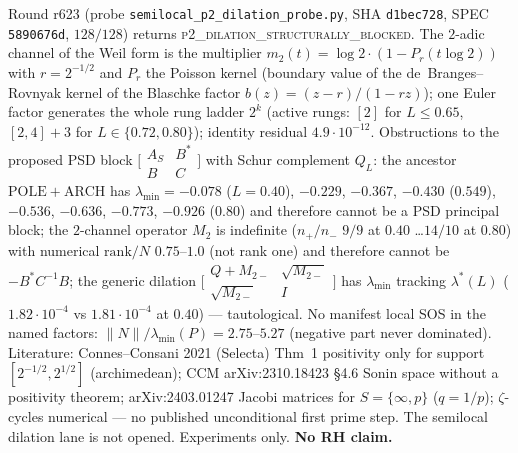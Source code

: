 \documentclass[11pt]{article}
\theoremstyle{definition}
\theoremstyle{remark}
\begin{document}
\noindent Round r623 (probe \texttt{semilocal\_p2\_dilation\_probe.py},
SHA \texttt{d1bec728}, SPEC \texttt{5890676d}, $128/128$) returns
\textsc{p2\_dilation\_structurally\_blocked}.  The $2$-adic channel
of the Weil form is the multiplier
$m_2(t)=\log 2\cdot(1-P_r(t\log 2))$ with $r=2^{-1/2}$ and $P_r$
the Poisson kernel (boundary value of the de~Branges--Rovnyak
kernel of the Blaschke factor $b(z)=(z-r)/(1-rz)$); one Euler
factor generates the whole rung ladder $2^k$ (active rungs:
$[2]$ for $L\le 0.65$, $[2,4]+3$ for $L\in\{0.72,0.80\}$);
identity residual $4.9\cdot10^{-12}$.  Obstructions to the
proposed PSD block $\bigl[\begin{smallmatrix}A_S&B^*\\B&C\end{smallmatrix}\bigr]$
with Schur complement $Q_L$: the ancestor $\mathrm{POLE}+\mathrm{ARCH}$
has $\lambda_{\min}=-0.078$ ($L=0.40$), $-0.229$, $-0.367$,
$-0.430$ ($0.549$), $-0.536$, $-0.636$, $-0.773$, $-0.926$
($0.80$) and therefore cannot be a PSD principal block; the
$2$-channel operator $M_2$ is indefinite ($n_+/n_-$ $9/9$ at
$0.40$ \ldots $14/10$ at $0.80$) with numerical $\mathrm{rank}/N$
$0.75$--$1.0$ (not rank one) and therefore cannot be
$-B^*C^{-1}B$; the generic dilation
$\bigl[\begin{smallmatrix}Q+M_{2-}&\sqrt{M_{2-}}\\\sqrt{M_{2-}}&I\end{smallmatrix}\bigr]$
has $\lambda_{\min}$ tracking $\lambda^*(L)$
($1.82\cdot10^{-4}$ vs $1.81\cdot10^{-4}$ at $0.40$) ---
tautological.  No manifest local SOS in the named factors:
$\lVert N\rVert/\lambda_{\min}(P)=2.75$--$5.27$ (negative part
never dominated).  Literature: Connes--Consani 2021 (Selecta)
Thm~1 positivity only for support $[2^{-1/2},2^{1/2}]$
(archimedean); CCM arXiv:2310.18423 \S4.6 Sonin space without a
positivity theorem; arXiv:2403.01247 Jacobi matrices for
$S=\{\infty,p\}$ ($q=1/p$); $\zeta$-cycles numerical --- no
published unconditional first prime step.  The semilocal
dilation lane is not opened.  Experiments only.
\textbf{No RH claim.}
\end{document}
